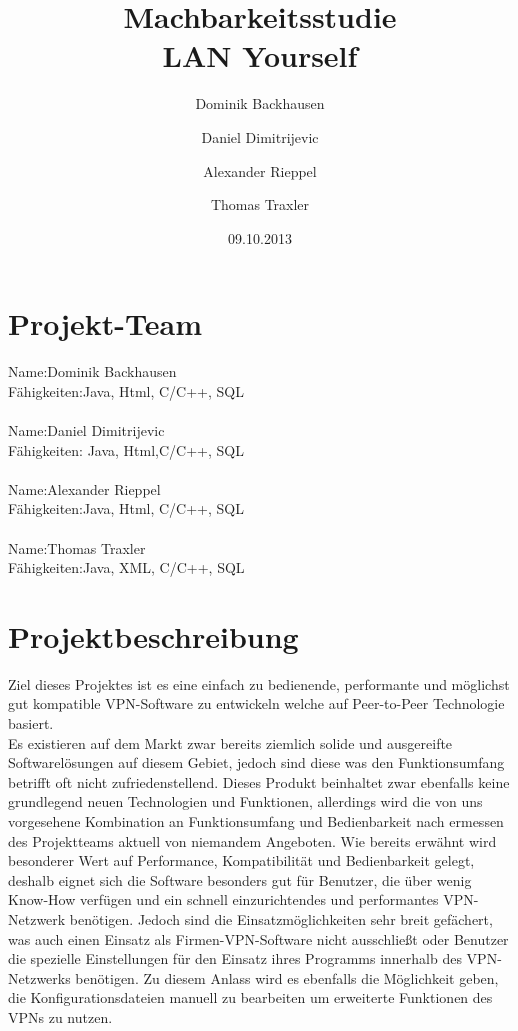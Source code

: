 \documentclass[a4paper,12pt]{scrreprt}
\begin{document}
\author{Dominik Backhausen\and Daniel Dimitrijevic\and Alexander Rieppel\and Thomas Traxler}
\title{Machbarkeitsstudie\\ LAN Yourself}
\date{09.10.2013}
\maketitle
\tableofcontents



\chapter{Projekt-Team}
	
	Name:Dominik Backhausen\\
	    Fähigkeiten:Java, Html, C/C++, SQL\\\\
	  	Name:Daniel Dimitrijevic
	\\ 	Fähigkeiten: Java, Html,C/C++, SQL    
	\\
	\\  Name:Alexander Rieppel
	\\
	    Fähigkeiten:Java, Html, C/C++, SQL
	    \\
	    \\
	    Name:Thomas Traxler
	    \\
	    Fähigkeiten:Java, XML, C/C++, SQL
	    \\
\chapter{Projektbeschreibung}
Ziel dieses Projektes ist es eine einfach zu bedienende, performante und möglichst gut kompatible VPN-Software zu entwickeln welche auf Peer-to-Peer Technologie basiert.\\

Es existieren auf dem Markt zwar bereits ziemlich solide und ausgereifte Softwarelösungen auf diesem Gebiet, jedoch sind diese was den Funktionsumfang betrifft oft nicht zufriedenstellend. Dieses Produkt beinhaltet zwar ebenfalls keine grundlegend neuen Technologien und Funktionen, allerdings wird die von uns vorgesehene Kombination an Funktionsumfang und Bedienbarkeit nach ermessen des Projektteams aktuell von niemandem Angeboten. Wie bereits erwähnt wird besonderer Wert auf Performance, Kompatibilität und Bedienbarkeit gelegt, deshalb eignet sich die Software besonders gut für Benutzer, die über wenig Know-How verfügen und ein schnell einzurichtendes und performantes VPN-Netzwerk benötigen. Jedoch sind die Einsatzmöglichkeiten sehr breit gefächert, was auch einen Einsatz als Firmen-VPN-Software nicht ausschließt oder Benutzer die spezielle Einstellungen für den Einsatz ihres Programms innerhalb des VPN-Netzwerks benötigen. Zu diesem Anlass wird es ebenfalls die Möglichkeit geben, die Konfigurationsdateien manuell zu bearbeiten um erweiterte Funktionen des VPNs zu nutzen.\\
\end{document}
